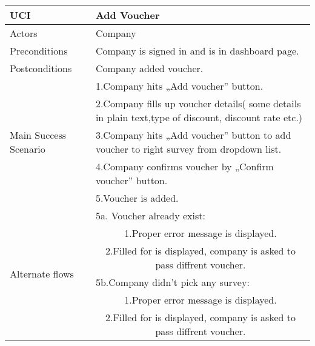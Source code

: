 	
	\begin{table}[H]
	\centering
	\sffamily\captionsetup{justification=raggedright,singlelinecheck=false,position = below, font = sf}
	\begin{tabular}{|m{3.5cm}|m{11cm}|}
	\hline 
	UCI & Add Voucher \\
	\hline
	Actors & Company \\
	\hline
	Preconditions & Company is signed in and is in dashboard page. \\
	\hline
	Postconditions & Company added voucher. \\	
	\hline
	\multirow{5}{*}{Main Success Scenario} & 1.Company hits „Add voucher” button. \\
	\cline{2-2}
	& 2.Company fills up voucher details( some details in plain text,type of discount, discount rate etc.) \\
	\cline{2-2}
	& 3.Company hits „Add voucher” button to add voucher to right survey from dropdown list. \\
	\cline{2-2}
	& 4.Company confirms voucher by „Confirm voucher” button. \\
	\cline{2-2}
	& 5.Voucher is added. \\
	\hline
	\multirow{6}{*}{Alternate flows} & 5a. Voucher already exist: \\
	\cline{2-2}
	& \multicolumn{1}{c|}{1.Proper error message is displayed.} \\
	\cline{2-2}
	& \multicolumn{1}{c|}{2.Filled for is displayed, company is asked to pass diffrent voucher.} \\
	\cline{2-2}
	& 5b.Company didn't pick any survey: \\
	\cline{2-2}
	& \multicolumn{1}{c|}{1.Proper error message is displayed.} \\
	\cline{2-2}
	& \multicolumn{1}{c|}{2.Filled for is displayed, company is asked to pass diffrent voucher.} \\
	\cline{2-2}
	\hline
	\end{tabular}
	\end{table}	
	

